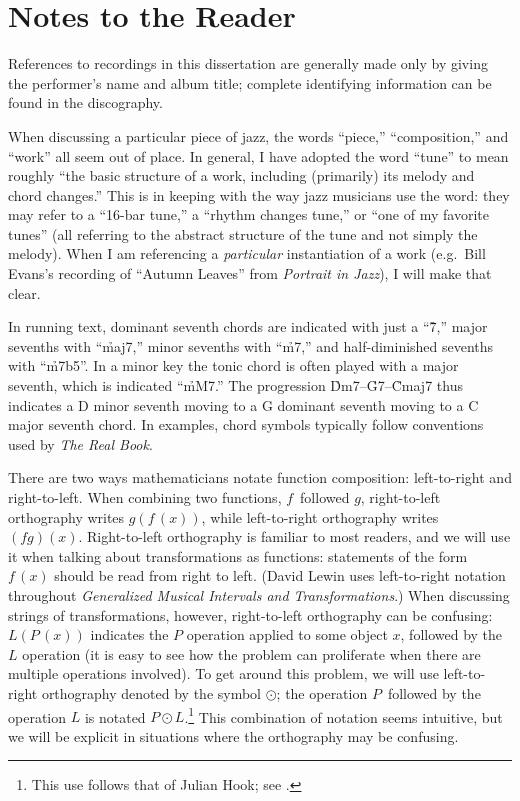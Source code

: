 {}
\listoftables

\clearpage

\section*{Notes to the Reader}
\label{sec:notes-to-reader}

\doublespacing
References to recordings in this dissertation are generally made only by
giving the performer’s name and album title; complete identifying information
can be found in the discography.

When discussing a particular piece of jazz, the words “piece,” “composition,”
and “work” all seem out of place. In general, I have adopted the word “tune”
to mean roughly “the basic structure of a work, including (primarily) its
melody and chord changes.” This is in keeping with the way jazz musicians use
the word: they may refer to a ``16-bar tune,'' a “rhythm changes tune,” or “one
of my favorite tunes” (all referring to the abstract structure of the tune and
not simply the melody). When I am referencing a \emph{particular}
instantiation of a work (e.g.~Bill Evans’s recording of “Autumn Leaves” from
\emph{Portrait in Jazz}), I will make that clear.

In running text, dominant seventh chords are indicated with just a “\h{7},”
major sevenths with “\h{maj7},” minor sevenths with “\h{m7},” and
half-diminished sevenths with “\h{m7b5}”. In a minor key the tonic chord is
often played with a major seventh, which is indicated “\h{mM7}.” The
progression \h{Dm7}--\h{G7}--\h{Cmaj7} thus indicates a D minor seventh moving
to a G dominant seventh moving to a C major seventh chord. In examples, chord
symbols typically follow conventions used by \emph{The Real Book}.

There are two ways mathematicians notate function composition: left-to-right
and right-to-left. When combining two functions, $f\,$ followed $g$,
right-to-left orthography writes $g(f\,(x))$, while left-to-right orthography
writes $(fg)(x)$. Right-to-left orthography is familiar to most readers, and
we will use it when talking about transformations as functions: statements of
the form $f\,(x)$ should be read from right to left. (David Lewin uses
left-to-right notation throughout \emph{Generalized Musical Intervals and
Transformations}.) When discussing strings of transformations, however,
right-to-left orthography can be confusing: $L(P\,(x))$ indicates the $P$
operation applied to some object $x$, followed by the $L$ operation (it is
easy to see how the problem can proliferate when there are multiple operations
involved). To get around this problem, we will use left-to-right orthography
denoted by the symbol $\odot$; the operation $P\,$ followed by the operation
$L$ is notated $P \odot L$.\footnote{This use follows that of Julian Hook; see
.} This combination of notation seems
intuitive, but we will be explicit in situations where the orthography may be
confusing.



